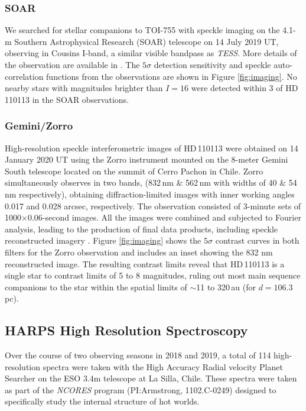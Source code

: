 \documentclass[fleqn,usenatbib]{mnras}
\newcommand{\tess}{{\it TESS}}
\newcommand{\Tstar}{HD\,110113}
\begin{document}
\subsubsection{SOAR}
We searched for stellar companions to TOI-755 with speckle imaging on the 4.1-m Southern Astrophysical Research (SOAR) telescope \citep{tokovinin2018ten} on 14 July 2019 UT, observing in Cousins I-band, a similar visible bandpass as \tess{}. More details of the observation are available in \citet{ziegler2020vizier}. The $5\sigma$ detection sensitivity and speckle auto-correlation functions from the observations are shown in Figure \ref{fig:imaging}. No nearby stars with magnitudes brighter than $I=16$ were detected within 3\arcsec{} of \Tstar{} in the SOAR observations.

\subsubsection{Gemini/Zorro}
High-resolution speckle interferometric images of \Tstar{} were obtained on 14 January 2020 UT using the Zorro instrument mounted on the 8-meter Gemini South telescope located on the summit of Cerro Pachon in Chile. 
Zorro simultaneously observes in two bands, (832\,nm \& 562\,nm with widths of 40 \& 54\,nm respectively), obtaining diffraction-limited images with inner working angles 0.017 and 0.028 arcsec, respectively.
The observation consisted of 3-minute sets of 1000$\times$0.06-second images. All the images were combined and subjected to Fourier analysis, leading to the production of final data products, including speckle reconstructed imagery \citep[see][]{2011AJ....142...19H}.
Figure \ref{fig:imaging} shows the $5\sigma$ contrast curves in both filters for the Zorro observation and includes an inset showing the 832 nm reconstructed image.
The resulting contrast limits reveal that \Tstar{} is a single star to contrast limits of 5 to 8 magnitudes, ruling out most main sequence companions to the star within the spatial limits of $\sim$11 to 320\,au (for $d=106.3$pc).

\subsection{HARPS High Resolution Spectroscopy}
Over the course of two observing seasons in 2018 and 2019, a total of 114 high-resolution spectra were taken with the High Accuracy Radial velocity Planet Searcher \citep[HARPS,][]{Pepe:2002,2003Msngr.114...20M} on the ESO 3.4m telescope at La Silla, Chile.
These spectra were taken as part of the \textit{NCORES} program (PI:Armstrong, 1102.C-0249) designed to specifically study the internal structure of hot worlds.
\end{document}
